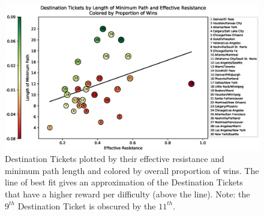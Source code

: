 \begin{figure}
    \centering
    \includegraphics[scale=.5]{figures/resistance_aggregate}
    \caption{Destination Tickets plotted by their effective
    resistance and minimum path length and colored
    by overall proportion of wins.
    The line of best fit gives an approximation of the
    Destination Tickets that have a higher reward per difficulty
    (above the line).
    Note: the $9^{th}$ Destination Ticket 
    is obscured by the $11^{th}$.}
    \label{fig:resistance}
\end{figure}
